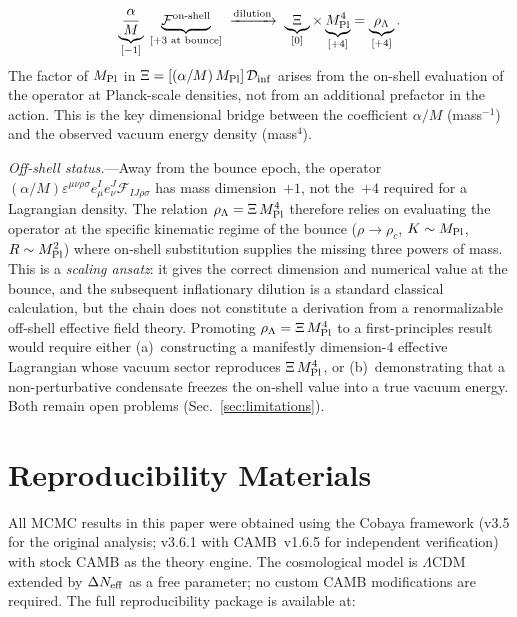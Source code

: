 \documentclass[aps,prd,twocolumn,superscriptaddress,showpacs,preprintnumbers,nofootinbib,longbibliography,floatfix]{revtex4-2}
\newcommand{\Dinf}{\mathcal{D}_{\rm inf}}
\newcommand{\MPl}{M_{\rm Pl}}
\newcommand{\Neff}{N_{\rm eff}}
\begin{document}
\begin{equation}
\underbrace{\frac{\alpha}{M}}_{[-1]}\;\underbrace{\mathcal{F}^{\rm on\text{-}shell}}_{[+3\text{ at bounce}]} \;\xrightarrow{\text{dilution}}\; \underbrace{\Xi}_{[0]} \times \underbrace{\MPl^4}_{[+4]} = \underbrace{\rho_\Lambda}_{[+4]}.
\end{equation}
The factor of $\MPl$ in $\Xi = [(\alpha/M)\,\MPl]\,\Dinf$ arises from the on-shell evaluation of the operator at Planck-scale densities, not from an additional prefactor in the action. This is the key dimensional bridge between the coefficient $\alpha/M$ (mass$^{-1}$) and the observed vacuum energy density (mass$^4$).

\textit{Off-shell status.}---Away from the bounce epoch, the operator $(\alpha/M)\varepsilon^{\mu\nu\rho\sigma}e^I_\mu e^J_\nu\mathcal{F}_{IJ\rho\sigma}$ has mass dimension~$+1$, not the~$+4$ required for a Lagrangian density. The relation $\rho_\Lambda = \Xi\,\MPl^4$ therefore relies on evaluating the operator at the specific kinematic regime of the bounce ($\rho\to\rho_c$, $K\sim\MPl$, $R\sim\MPl^2$) where on-shell substitution supplies the missing three powers of mass. This is a \textit{scaling ansatz}: it gives the correct dimension and numerical value at the bounce, and the subsequent inflationary dilution is a standard classical calculation, but the chain does not constitute a derivation from a renormalizable off-shell effective field theory. Promoting $\rho_\Lambda = \Xi\,\MPl^4$ to a first-principles result would require either (a)~constructing a manifestly dimension-4 effective Lagrangian whose vacuum sector reproduces $\Xi\,\MPl^4$, or (b)~demonstrating that a non-perturbative condensate freezes the on-shell value into a true vacuum energy. Both remain open problems (Sec.~\ref{sec:limitations}).


\section{Reproducibility Materials}\label{app:reproducibility}

All MCMC results in this paper were obtained using the Cobaya framework (v3.5 for the original analysis; v3.6.1 with CAMB~v1.6.5 for independent verification)~\cite{Cobaya2021} with stock CAMB as the theory engine. The cosmological model is $\Lambda$CDM extended by $\Delta\Neff$ as a free parameter; no custom CAMB modifications are required. The full reproducibility package is available at:
\end{document}
